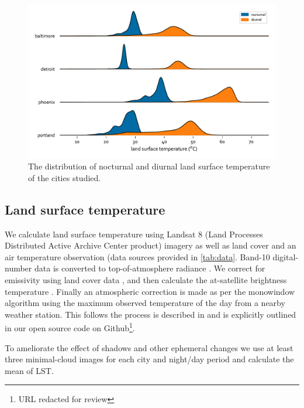 \documentclass[final,3p,times,twocolumn,sort&compress]{elsarticle}
\begin{document}
\begin{figure}
    \centering
    \includegraphics[width=\linewidth]{fig/report/joyplot_lst_500.pdf}
    \caption{The distribution of nocturnal and diurnal land surface temperature of the cities studied.}
    \label{fig:joy}
\end{figure}

\subsection{Land surface temperature}
We calculate land surface temperature using Landsat 8 (Land Processes Distributed Active Archive Center product) imagery as well as land cover and an air temperature observation (data sources provided in \ref{tab:data}. Band-10 digital-number data is converted to top-of-atmosphere radiance \cite{Jimenez-Munoz2003-wc}. We correct for emissivity using land cover data \cite{Alipour2003-gb}, and then calculate the at-satellite brightness temperature \cite{Jimenez-Munoz2003-wc}. Finally an atmospheric correction is made as per the monowindow algorithm \cite{Qin2001-jn} using the maximum observed temperature of the day from a nearby weather station. This follows the process is described in \cite{Scott2016-lc} and is explicitly outlined in our open source code on Github\footnote{URL redacted for review}. 

To ameliorate the effect of shadows and other ephemeral changes we use at least three minimal-cloud images for each city and night/day period and calculate the mean of LST.
\end{document}
